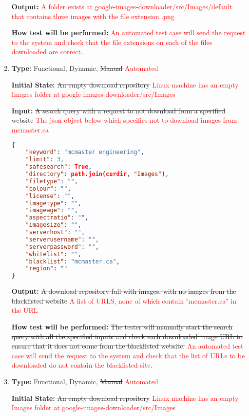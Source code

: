 \documentclass[12pt, titlepage]{article}
\begin{document}
\begin{enumerate}[label=FR-SQ\arabic*:, wide=0pt, leftmargin=*]
\textbf{Output:} \textcolor{red}{A folder exists at google-images-downloader/src/Images/default that contains
three images with the file extension .png}
					
\textbf{How test will be performed:} \textcolor{red}{An automated test case will send the request 
to the system and check that the file extensions on each of the files downloaded are correct.}

\item \phantom{empty}

\textbf{Type:} Functional, Dynamic, \sout{Manual} \textcolor{red}{Automated}
					
\textbf{Initial State:} \sout{An empty download repository}
\textcolor{red}{Linux machine has an empty Images folder at google-images-downloader/src/Images}
					
\textbf{Input:} \sout{A search query with a request to not download from a specified website}
\textcolor{red}{The json object below which specifies not to download images from mcmaster.ca}
\begin{lstlisting}[language=json,firstnumber=1]
{
	"keyword": "mcmaster engineering",
	"limit": 3,
	"safesearch": True,
	"directory": path.join(curdir, "Images"),
	"filetype": "",
	"colour": "",
	"license": "",
	"imagetype": "",
	"imageage": "",
	"aspectratio": "",
	"imagesize": "",
	"serverhost": "",
	"serverusername": "",
	"serverpassword": "",
	"whitelist": "",
	"blacklist": "mcmaster.ca",
	"region": ""
}
\end{lstlisting}
					
\textbf{Output:} \sout{A download repository full with images, with no images from the blacklisted website}
\textcolor{red}{A list of URLS, none of which contain "mcmaster.ca" in the URL}
					
\textbf{How test will be performed:} \sout{The tester will manually start the search query with all 
the specified inputs and check each downloaded image URL to ensure that it does not come from 
the blacklisted website.}
\textcolor{red}{An automated test case will send the request to the system and check that the list 
of URLs to be downloaded do not contain the blacklisted site.}

\item \phantom{empty}

\textbf{Type:} Functional, Dynamic, \sout{Manual} \textcolor{red}{Automated}
					
\textbf{Initial State:} \sout{An empty download repository}
\textcolor{red}{Linux machine has an empty Images folder at google-images-downloader/src/Images}
					

\end{enumerate}
\end{document}
